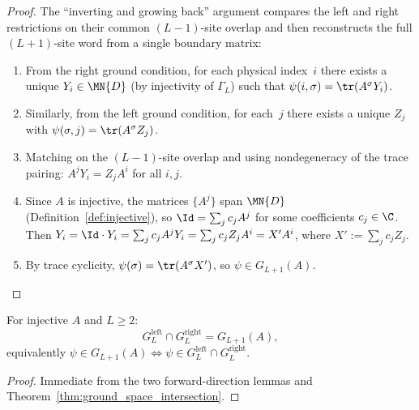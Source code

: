 \begin{proof}
    \leanok
    The ``inverting and growing back'' argument compares the left and right
    restrictions on their common $(L-1)$-site overlap and then reconstructs the
    full $(L+1)$-site word from a single boundary matrix:
    \begin{center}
    \end{center}
    \begin{enumerate}
        \item From the right ground condition, for each physical index~$i$ there
              exists a unique $Y_i \in \MN{D}$ (by injectivity of $\Gamma_L$) such
              that $\psi(i,\sigma) = \tr(A^\sigma Y_i)$.
        \item Similarly, from the left ground condition, for each~$j$ there exists
              a unique $Z_j$ with $\psi(\sigma,j) = \tr(A^\sigma Z_j)$.
        \item Matching on the $(L{-}1)$-site overlap and using nondegeneracy of
              the trace pairing:
              $A^j Y_i = Z_j A^i$ for all $i,j$.
        \item Since $A$ is injective, the matrices $\{A^j\}$ span $\MN{D}$
              (Definition~\ref{def:injective}), so $\Id = \sum_j c_j A^j$ for
              some coefficients $c_j \in \C$. Then
              $Y_i = \Id \cdot Y_i = \sum_j c_j A^j Y_i = \sum_j c_j Z_j A^i = X' A^i$,
              where $X' := \sum_j c_j Z_j$.
        \item By trace cyclicity,
              $\psi(\sigma) = \tr(A^\sigma X')$, so $\psi \in G_{L+1}(A)$.
    \end{enumerate}
\end{proof}

\begin{theorem}\label{thm:ground_space_iff}
    \leanok
    For injective $A$ and $L \ge 2$:
    \[
        G_L^{\mathrm{left}}\cap G_L^{\mathrm{right}}
        =
        G_{L+1}(A),
    \]
    equivalently
    $\psi \in G_{L+1}(A) \iff
        \psi \in G_L^{\mathrm{left}} \cap G_L^{\mathrm{right}}$.
\end{theorem}

\begin{proof}
    \leanok
    Immediate from the two forward-direction lemmas and
    Theorem~\ref{thm:ground_space_intersection}.
\end{proof}

